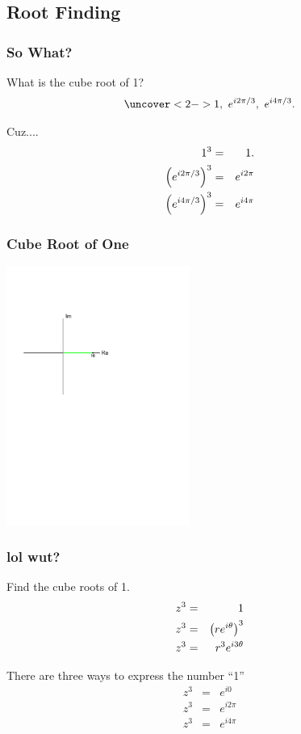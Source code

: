 \subsection{Root Finding}

\begin{frame}
  \frametitle{So What?}

  What is the cube root of 1?
  \begin{eqnarray*}
    \uncover<2->{1,~e^{i2\pi/3},~e^{i4\pi/3}}.
  \end{eqnarray*}

  {
    Cuz....
    \begin{eqnarray*}
      1^3 & = & 1. \\
      \left( e^{i2\pi/3} \right)^3 & = &  e^{i2\pi} \\
      \left( e^{i4\pi/3} \right)^3 & = & e^{i4\pi}
    \end{eqnarray*}


  }

  
\end{frame}

\begin{frame}
  \frametitle{Cube Root of One}
  \centerline{\includegraphics[width=6cm]{img/cubeRoot}}
\end{frame}



\begin{frame}
  \frametitle{lol wut?}

  Find the cube roots of 1.
  \begin{eqnarray*}
    z^3 & = & 1 \\
    z^3 & = & \left( r e^{i\theta} \right)^3 \\
    z^3 & = & r^3 e^{i3\theta}
  \end{eqnarray*}

  There are three ways to express the number ``1''
  \begin{eqnarray*}
    z^3 & = & e^{i0} \\
    z^3 & = & e^{i2\pi} \\
    z^3 & = & e^{i4\pi}
  \end{eqnarray*}
  
\end{frame}


